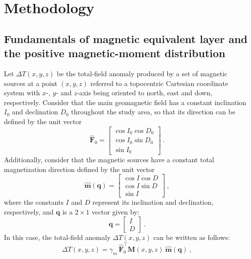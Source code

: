 \section{Methodology}
\label{sec:methodology}

\subsection{Fundamentals of magnetic equivalent layer and the positive magnetic-moment distribution}
\label{subsec:mag_eqlayer}

Let $\Delta T(x, y, z)$ be the total-field anomaly produced by a set of magnetic
sources at a point $(x, y, z)$ referred to a topocentric Cartesian coordinate system 
with $x$-, $y$- and $z$-axis being oriented to north, east and down, respectively.
Consider that the main geomagnetic field has a constant inclination $I_{0}$ and declination
$D_{0}$ throughout the study area, so that its direction can be defined by the unit vector
\begin{equation}
\hat{\mathbf{F}}_{0} = \begin{bmatrix}
\cos I_{0} \cos D_{0} \\
\cos I_{0} \sin D_{0} \\
\sin I_{0}
\end{bmatrix} \: .
\label{eq:main_field}
\end{equation}
Additionally, consider that the magnetic sources have a constant total magnetization 
direction defined by the unit vector
\begin{equation}
\hat{\mathbf{m}}(\mathbf{q}) = \begin{bmatrix}
\cos {I} \cos {D} \\
\cos {I} \sin {D} \\
\sin {I}
\end{bmatrix} \: ,
\label{eq:mag_vec}
\end{equation}
where the constants $I$ and $D$ represent its inclination and declination, respectively,
and $\mathbf{q}$ is a $2 \times 1$ vector given by:
\begin{equation}
\mathbf{q} = \begin{bmatrix}
I \\ 
D
\end{bmatrix} \: .
\label{eq:q_vector}
\end{equation}
In this case, the total-field anomaly $\Delta T(x, y, z)$ can be written as follows:
\begin{equation}
\Delta T(x, y, z) = \gamma_{m} \, \hat{\mathbf{F}}_{0}^{\top} \mathbf{M}(x, y, z) \: 
\hat{\mathbf{m}}(\mathbf{q}) \: ,
\label{eq:tfanomaly}
\end{equation}
